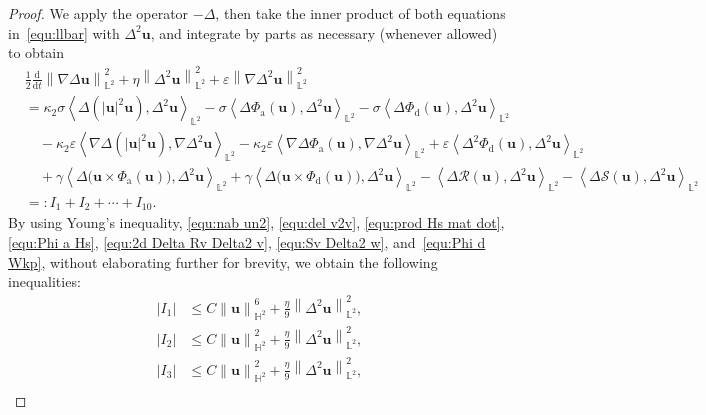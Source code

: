 \documentclass[11pt, reqno]{amsart}
\theoremstyle{definition}
\numberwithin{equation}{section}
\newcommand{\bff}{\boldsymbol}
\newcommand{\bb}{\mathbb}
\newcommand{\ddt}{\frac{\mathrm{d}}{\mathrm{d}t}}
\newcommand{\norm}[2]{\left\|{#1}\right\|_{#2}}
\newcommand{\inpro}[2]{\left\langle#1,#2\right\rangle}
\newcommand{\abs}[1]{\left|{#1}\right|}
\begin{document}
\begin{proof}
We apply the operator $-\Delta$, then take the inner product of both equations in~\eqref{equ:llbar} with $\Delta^2 \bff{u}$, and integrate by parts as necessary (whenever allowed) to obtain
\begin{align}\label{equ:I1 to I9 unif}
    &\frac12 \ddt \norm{\nabla\Delta \bff{u}}{\bb{L}^2}^2
    +
    \eta \norm{\Delta^2 \bff{u}}{\bb{L}^2}^2
    +
    \varepsilon \norm{\nabla\Delta^2 \bff{u}}{\bb{L}^2}^2
    \nonumber\\
    &=
    \kappa_2 \sigma \inpro{\Delta(|\bff{u}|^2 \bff{u})}{\Delta^2 \bff{u}}_{\bb{L}^2}
    -
    \sigma \inpro{\Delta \Phi_{\mathrm{a}}(\bff{u})}{\Delta^2 \bff{u}}_{\bb{L}^2}
    -
    \sigma \inpro{\Delta \Phi_{\mathrm{d}}(\bff{u})}{\Delta^2 \bff{u}}_{\bb{L}^2}
    \nonumber\\
    &\quad
    -
    \kappa_2 \varepsilon \inpro{\nabla\Delta(|\bff{u}|^2 \bff{u})}{\nabla\Delta^2 \bff{u}}_{\bb{L}^2}
    -
    \kappa_2 \varepsilon \inpro{\nabla\Delta \Phi_{\mathrm{a}}(\bff{u})}{\nabla\Delta^2 \bff{u}}_{\bb{L}^2}
    +
    \varepsilon \inpro{\Delta^2 \Phi_{\mathrm{d}}(\bff{u})}{\Delta^2 \bff{u}}_{\bb{L}^2}
    \nonumber\\
    &\quad
    +
    \gamma \inpro{\Delta\big(\bff{u}\times \Phi_{\mathrm{a}}(\bff{u})\big)}{\Delta^2 \bff{u}}_{\bb{L}^2}
    +
    \gamma \inpro{\Delta\big(\bff{u}\times \Phi_{\mathrm{d}}(\bff{u})\big)}{\Delta^2 \bff{u}}_{\bb{L}^2}
    -
    \inpro{\Delta \mathcal{R}(\bff{u})}{\Delta^2 \bff{u}}_{\bb{L}^2}
    -
    \inpro{\Delta \mathcal{S}(\bff{u})}{\Delta^2 \bff{u}}_{\bb{L}^2}
    \nonumber \\
    &=:
    I_1+I_2+\cdots+I_{10}.
\end{align}
By using Young's inequality, \eqref{equ:nab un2}, \eqref{equ:del v2v}, \eqref{equ:prod Hs mat dot}, \eqref{equ:Phi a Hs}, \eqref{equ:2d Delta Rv Delta2 v}, \eqref{equ:Sv Delta2 w}, and~\eqref{equ:Phi d Wkp}, without elaborating further for brevity, we obtain the following inequalities:
\begin{align*}
    \abs{I_1}
    &\leq
    C \norm{\bff{u}}{\bb{H}^2}^6 + \frac{\eta}{9} \norm{\Delta^2 \bff{u}}{\bb{L}^2}^2,
    \\
    \abs{I_2}
    &\leq
    C\norm{\bff{u}}{\bb{H}^2}^2 + \frac{\eta}{9} \norm{\Delta^2 \bff{u}}{\bb{L}^2}^2,
    \\
    \abs{I_3}
    &\leq
    C \norm{\bff{u}}{\bb{H}^2}^2 + \frac{\eta}{9} \norm{\Delta^2 \bff{u}}{\bb{L}^2}^2,
    \\

\end{align*}
\end{proof}
\end{document}
